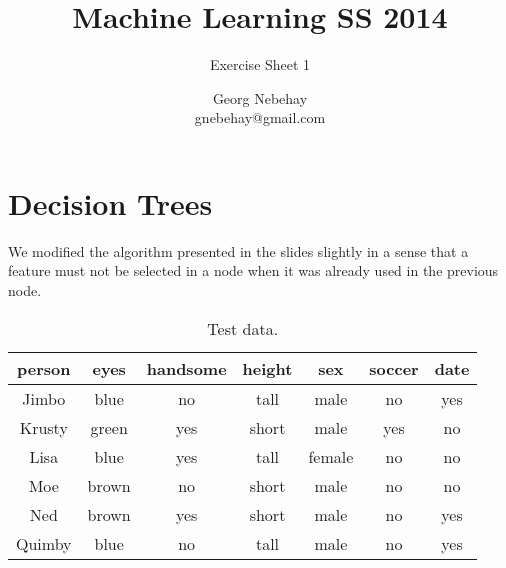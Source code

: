 \documentclass{scrartcl}
\title{Machine Learning SS 2014}}
\subtitle{Exercise Sheet 1}
\author{Georg Nebehay\\gnebehay@gmail.com}
\date{}
\begin{document}
\maketitle

\section{Decision Trees}

We modified the algorithm presented in the slides slightly in a sense that
a feature must not be selected in a node when it was already used in the previous node.



\begin{table}[h!]
  \centering
  \begin{tabular}{cccccc|c}
    \toprule
    person      & eyes  & handsome & height & sex    & soccer & date\\
    \midrule
    Jimbo       & blue  & no       & tall   & male   & no     & yes\\
    Krusty      & green & yes      & short  & male   & yes    & no\\
    Lisa        & blue  & yes      & tall   & female & no     & no\\
    Moe         & brown & no       & short  & male   & no     & no\\
    Ned         & brown & yes      & short  & male   & no     & yes\\
    Quimby      & blue  & no       & tall   & male   & no     & yes\\
    \bottomrule
  \end{tabular}
  \caption{Test data.}
\end{table}
\end{document}

